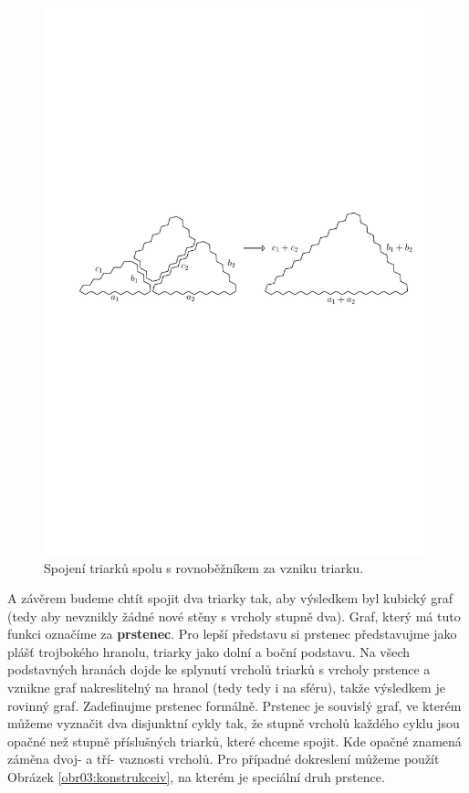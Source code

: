 \begin{figure}[h!]\centering
\includegraphics[width=\textwidth]{../img/T-T}
\caption{Spojení triarků spolu s rovnoběžníkem za vzniku triarku.}
\label{obr22:T-T}
\end{figure}

A závěrem budeme chtít spojit dva triarky tak, aby výsledkem byl kubický graf (tedy aby nevznikly žádné nové stěny s vrcholy stupně dva). Graf, který má tuto funkci označíme za \textbf{prstenec}. Pro lepší představu si prstenec představujme jako plášť trojbokého hranolu, triarky jako dolní a boční podstavu. Na všech podstavných hranách dojde ke splynutí vrcholů triarků s vrcholy prstence a vznikne graf nakreslitelný na hranol (tedy tedy i na sféru), takže výsledkem je rovinný graf. Zadefinujme prstenec formálně. Prstenec je souvislý graf, ve kterém můžeme vyznačit dva disjunktní cykly tak, že stupně vrcholů každého cyklu jsou opačné než stupně příslušných triarků, které chceme spojit. Kde opačné znamená záměna dvoj- a tří- vaznosti vrcholů. Pro případné dokreslení můžeme použít Obrázek \ref{obr03:konstrukceiv}, na kterém je speciální druh prstence. 

